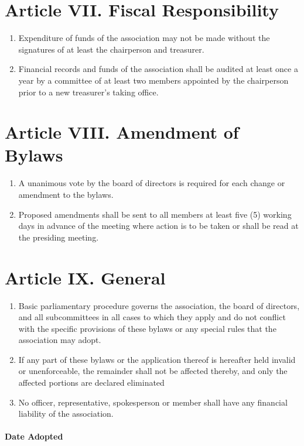 \documentclass[letterpaper,10pt]{article}
\begin{document}
\section*{Article VII. Fiscal Responsibility}
\begin{enumerate}[label=(\Alph*)]
\item Expenditure of funds of the association may not be made without the signatures of
at least the chairperson and treasurer.
\item Financial records and funds of the association shall be audited at least once a year
by a committee of at least two members appointed by the chairperson prior to a new treasurer’s
taking office.
\end{enumerate}


\section*{Article VIII. Amendment of Bylaws}
\begin{enumerate}[label=(\Alph*)]
\item A unanimous vote by the board of directors is required for each change or amendment to the bylaws.
\item Proposed amendments shall be sent to all members at least five (5) working days in advance of the meeting where action is to be taken or shall be read at the presiding meeting.
\end{enumerate}

\section*{Article IX. General}
\begin{enumerate}[label=(\Alph*)]
\item Basic parliamentary procedure governs the
association, the board of directors, and all subcommittees in all cases to which
they apply and do not conflict with the specific provisions of these bylaws or any
special rules that the association may adopt.
\item If any part of these bylaws or the application thereof is hereafter held invalid or
unenforceable, the remainder shall not be affected thereby, and only the affected
portions are declared eliminated
\item No officer, representative, spokesperson or member shall have any financial
liability of the association.

\end{enumerate}

\paragraph{Date Adopted}
\end{document}
